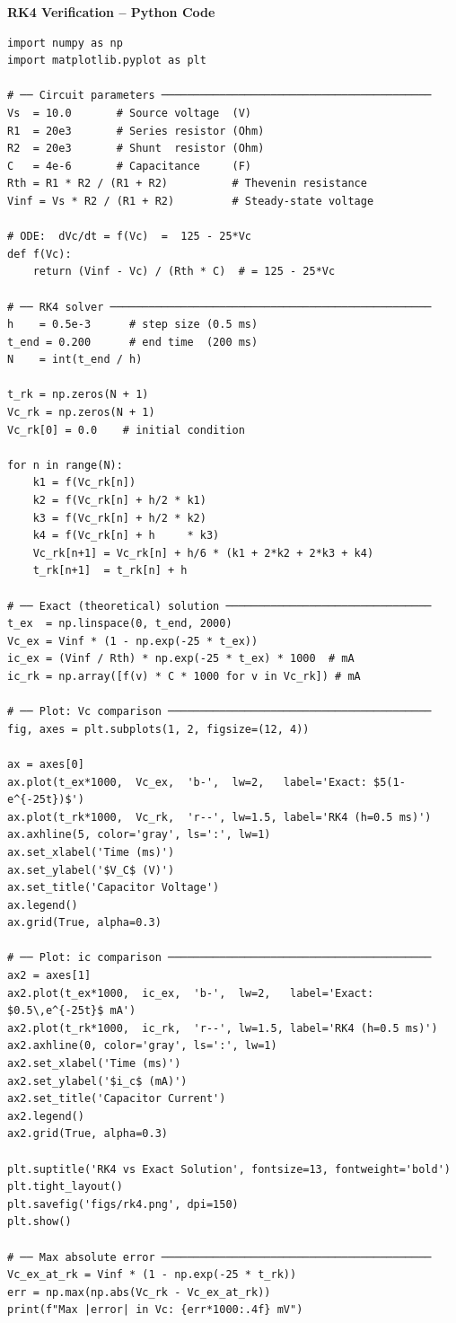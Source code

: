 \documentclass[12pt]{beamer}
\begin{document}
\begin{frame}{\textbf{RK4 Verification -- Python Code}}
\begin{lstlisting}
import numpy as np
import matplotlib.pyplot as plt

# ── Circuit parameters ──────────────────────────────────────────
Vs  = 10.0       # Source voltage  (V)
R1  = 20e3       # Series resistor (Ohm)
R2  = 20e3       # Shunt  resistor (Ohm)
C   = 4e-6       # Capacitance     (F)
Rth = R1 * R2 / (R1 + R2)          # Thevenin resistance
Vinf = Vs * R2 / (R1 + R2)         # Steady-state voltage

# ODE:  dVc/dt = f(Vc)  =  125 - 25*Vc
def f(Vc):
    return (Vinf - Vc) / (Rth * C)  # = 125 - 25*Vc

# ── RK4 solver ──────────────────────────────────────────────────
h    = 0.5e-3      # step size (0.5 ms)
t_end = 0.200      # end time  (200 ms)
N    = int(t_end / h)

t_rk = np.zeros(N + 1)
Vc_rk = np.zeros(N + 1)
Vc_rk[0] = 0.0    # initial condition

for n in range(N):
    k1 = f(Vc_rk[n])
    k2 = f(Vc_rk[n] + h/2 * k1)
    k3 = f(Vc_rk[n] + h/2 * k2)
    k4 = f(Vc_rk[n] + h     * k3)
    Vc_rk[n+1] = Vc_rk[n] + h/6 * (k1 + 2*k2 + 2*k3 + k4)
    t_rk[n+1]  = t_rk[n] + h

# ── Exact (theoretical) solution ────────────────────────────────
t_ex  = np.linspace(0, t_end, 2000)
Vc_ex = Vinf * (1 - np.exp(-25 * t_ex))
ic_ex = (Vinf / Rth) * np.exp(-25 * t_ex) * 1000  # mA
ic_rk = np.array([f(v) * C * 1000 for v in Vc_rk]) # mA

# ── Plot: Vc comparison ─────────────────────────────────────────
fig, axes = plt.subplots(1, 2, figsize=(12, 4))

ax = axes[0]
ax.plot(t_ex*1000,  Vc_ex,  'b-',  lw=2,   label='Exact: $5(1-e^{-25t})$')
ax.plot(t_rk*1000,  Vc_rk,  'r--', lw=1.5, label='RK4 (h=0.5 ms)')
ax.axhline(5, color='gray', ls=':', lw=1)
ax.set_xlabel('Time (ms)')
ax.set_ylabel('$V_C$ (V)')
ax.set_title('Capacitor Voltage')
ax.legend()
ax.grid(True, alpha=0.3)

# ── Plot: ic comparison ─────────────────────────────────────────
ax2 = axes[1]
ax2.plot(t_ex*1000,  ic_ex,  'b-',  lw=2,   label='Exact: $0.5\,e^{-25t}$ mA')
ax2.plot(t_rk*1000,  ic_rk,  'r--', lw=1.5, label='RK4 (h=0.5 ms)')
ax2.axhline(0, color='gray', ls=':', lw=1)
ax2.set_xlabel('Time (ms)')
ax2.set_ylabel('$i_c$ (mA)')
ax2.set_title('Capacitor Current')
ax2.legend()
ax2.grid(True, alpha=0.3)

plt.suptitle('RK4 vs Exact Solution', fontsize=13, fontweight='bold')
plt.tight_layout()
plt.savefig('figs/rk4.png', dpi=150)
plt.show()

# ── Max absolute error ──────────────────────────────────────────
Vc_ex_at_rk = Vinf * (1 - np.exp(-25 * t_rk))
err = np.max(np.abs(Vc_rk - Vc_ex_at_rk))
print(f"Max |error| in Vc: {err*1000:.4f} mV")
\end{lstlisting}
\end{frame}
\end{document}
